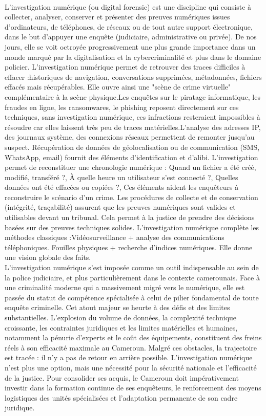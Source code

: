 \documentclass[]{article}
\begin{document}
\paragraph{}
L’investigation numérique (ou digital forensic) est une discipline qui consiste à collecter, analyser, conserver et présenter des preuves numériques issues d’ordinateurs, de téléphones, de réseaux ou de tout autre support électronique, dans le but d’appuyer une enquête (judiciaire, administrative ou privée). De nos jours, elle se voit octroyée progressivement une plus grande importance dans un monde marqué par la digitalisation et la cybercriminalité et plus dans le domaine policier. L’investigation numérique permet de retrouver des traces difficiles à effacer :historiques de navigation, conversations supprimées, métadonnées, fichiers effacés mais récupérables. Elle ouvre ainsi une "scène de crime virtuelle" complémentaire à la scène physique.Les enquêtes sur le piratage informatique, les fraudes en ligne, les ransomwares, le phishing reposent directement sur ces techniques, sans investigation numérique, ces infractions resteraient impossibles à résoudre car elles laissent très peu de traces matérielles.L’analyse des adresses IP, des journaux système, des connexions réseaux permettent de remonter jusqu’au suspect. Récupération de données de géolocalisation ou de communication (SMS, WhatsApp, email) fournit des éléments d’identification et d’alibi. L’investigation permet de reconstituer une chronologie numérique : Quand un fichier a été créé, modifié, transféré ?, À quelle heure un utilisateur s’est connecté ?, Quelles données ont été effacées ou copiées ?, Ces éléments aident les enquêteurs à reconstruire le scénario d’un crime. Les procédures de collecte et de conservation (intégrité, traçabilité) assurent que les preuves numériques sont valides et utilisables devant un tribunal. Cela permet à la justice de prendre des décisions basées sur des preuves techniques solides. L’investigation numérique complète les méthodes classiques :Vidéosurveillance + analyse des communications téléphoniques. Fouilles physiques + recherche d’indices numériques. Elle donne une vision globale des faits.\\
L’investigation numérique s’est imposée comme un outil indispensable au sein de la police judiciaire, et plus particulièrement dans le contexte camerounais. Face à une criminalité moderne qui a massivement migré vers le numérique, elle est passée du statut de compétence spécialisée à celui de pilier fondamental de toute enquête criminelle. Cet atout majeur se heurte à des défis et des limites substantielles. L’explosion du volume de données, la complexité technique croissante, les contraintes juridiques et les limites matérielles et humaines, notamment la pénurie d’experts et le coût des équipements, constituent des freins réels à son efficacité maximale au Cameroun. Malgré ces obstacles, la trajectoire est tracée : il n’y a pas de retour en arrière possible. L’investigation numérique n’est plus une option, mais une nécessité pour la sécurité nationale et l’efficacité de la justice. Pour consolider ses acquis, le Cameroun doit impérativement investir dans la formation continue de ses enquêteurs, le renforcement des moyens logistiques des unités spécialisées et l’adaptation permanente de son cadre juridique.
\end{document}
